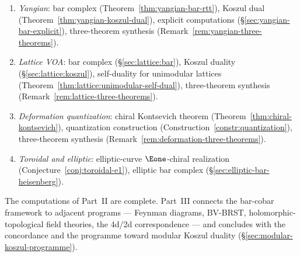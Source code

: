 \begin{remark}
\begin{enumerate}
  Koszul duality (Theorem~\ref{thm:w-algebra-koszul-main}),
  genus-$1$ pipeline (\S\ref{sec:w3-genus-one-pipeline}),
  general $\kappa$ formula (Theorem~\ref{thm:wn-obstruction}),
  three-theorem synthesis
  (Remark~\ref{rem:w-algebra-three-theorems}).
\item \emph{Yangian}:
  bar complex (Theorem~\ref{thm:yangian-bar-rtt}),
  Koszul dual (Theorem~\ref{thm:yangian-koszul-dual}),
  explicit computations (\S\ref{sec:yangian-bar-explicit}),
  three-theorem synthesis
  (Remark~\ref{rem:yangian-three-theorems}).
\item \emph{Lattice VOA}:
  bar complex (\S\ref{sec:lattice:bar}),
  Koszul duality (\S\ref{sec:lattice:koszul}),
  self-duality for unimodular lattices
  (Theorem~\ref{thm:lattice:unimodular-self-dual}),
  three-theorem synthesis
  (Remark~\ref{rem:lattice-three-theorems}).
\item \emph{Deformation quantization}:
  chiral Kontsevich theorem
  (Theorem~\ref{thm:chiral-kontsevich}),
  quantization construction
  (Construction~\ref{constr:quantization}),
  three-theorem synthesis
  (Remark~\ref{rem:deformation-three-theorems}).
\item \emph{Toroidal and elliptic}:
  elliptic-curve $\Eone$-chiral realization
  (Conjecture~\ref{conj:toroidal-e1}),
  elliptic bar complex
  (\S\ref{sec:elliptic-bar-heisenberg}).
\end{enumerate}
\end{remark}

\medskip

\noindent
The computations of Part~II are complete.  Part~III connects the bar-cobar framework to adjacent programs --- Feynman diagrams, BV-BRST, holomorphic-topological field theories, the 4d/2d correspondence --- and concludes with the concordance and the programme toward modular Koszul duality (\S\ref{sec:modular-koszul-programme}).
